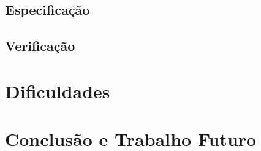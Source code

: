 \documentclass[runningheads,a4paper]{llncs}
\begin{document}
\subsection{Especificação}


\subsection{Verificação}


\section{Dificuldades}



\section{Conclusão e Trabalho Futuro} \label{SecConclusion}

%
%
%
% 
% 
%

{}
\end{document}
